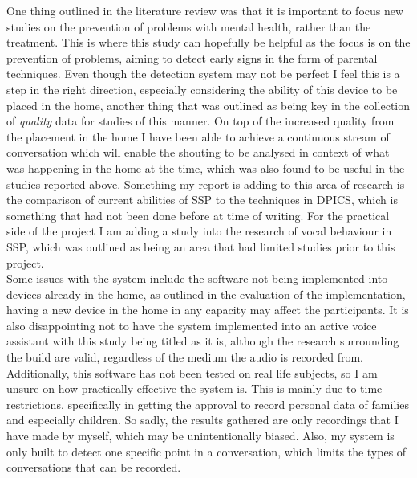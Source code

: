 \documentclass[a4paper,11pt]{report}
\begin{document}
One thing outlined in the literature review was that it is important to focus new studies on the prevention of problems with mental health, rather than the treatment. This is where this study can hopefully be helpful as the focus is on the prevention of problems, aiming to detect early signs in the form of parental techniques. Even though the detection system may not be perfect I feel this is a step in the right direction, especially considering the ability of this device to be placed in the home, another thing that was outlined as being key in the collection of \textit{quality} data for studies of this manner. On top of the increased quality from the placement in the home I have been able to achieve a continuous stream of conversation which will enable the shouting to be analysed in context of what was happening in the home at the time, which was also found to be useful in the studies reported above. Something my report is adding to this area of research is the comparison of current abilities of SSP to the techniques in DPICS, which is something that had not been done before at time of writing. For the practical side of the project I am adding a study into the research of vocal behaviour in SSP, which was outlined as being an area that had limited studies prior to this project.  \\

Some issues with the system include the software not being implemented into devices already in the home, as outlined in the evaluation of the implementation, having a new device in the home in any capacity may affect the participants. It is also disappointing not to have the system implemented into an active voice assistant with this study being titled as it is, although the research surrounding the build are valid, regardless of the medium the audio is recorded from. Additionally, this software has not been tested on real life subjects, so I am unsure on how practically effective the system is. This is mainly due to time restrictions, specifically in getting the approval to record personal data of families and especially children. So sadly, the results gathered are only recordings that I have made by myself, which may be unintentionally biased. Also, my system is only built to detect one specific point in a conversation, which limits the types of conversations that can be recorded. 
\end{document}
